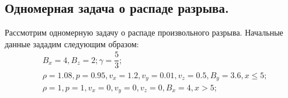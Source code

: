 \documentclass[14pt, a4paper, fleqn]{extreport}
\begin{document}
	\subsection{Одномерная задача о распаде разрыва.}
	
	Рассмотрим одномерную задачу о распаде произвольного 
	разрыва.
	Начальные данные зададим следующим образом:
	\begin{equation*}
	\begin{split}
		&B_x = 4, B_z = 2; \gamma = \dfrac{5}{3}; \\
		&\rho = 1.08, p = 0.95, v_x = 1.2, v_y = 0.01, v_z = 0.5, 
		                        B_y = 3.6, x \le 5; \\
		&\rho = 1, p = 1, v_x = 0, v_y = 0, v_z = 0,
						  B_x = 4, x > 5;
	\end{split}
	\end{equation*}
	
\end{document}
